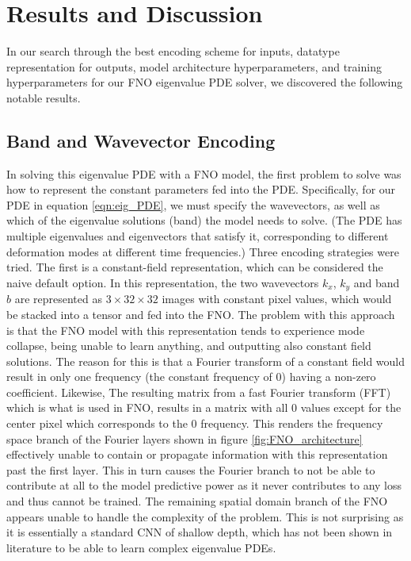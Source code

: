 \documentclass[preprint,review,12pt]{elsarticle}
\begin{document}
\section{Results and Discussion}
In our search through the best encoding scheme for inputs, datatype representation for outputs, model architecture hyperparameters, and training hyperparameters for our FNO eigenvalue PDE solver, we discovered the following notable results.  

\subsection{Band and Wavevector Encoding}
In solving this eigenvalue PDE with a FNO model, the first problem to solve was how to represent the constant parameters fed into the PDE. Specifically, for our PDE in equation \ref{eqn:eig_PDE}, we must specify the wavevectors, as well as which of the eigenvalue solutions (band) the model needs to solve. (The PDE has multiple eigenvalues and eigenvectors that satisfy it, corresponding to different deformation modes at different time frequencies.) Three encoding strategies were tried. The first is a constant-field representation, which can be considered the naive default option. In this representation, the two wavevectors $k_x$, $k_y$ and band $b$ are represented as $3 \times 32 \times 32$ images with constant pixel values, which would be stacked into a tensor and fed into the FNO. The problem with this approach is that the FNO model with this representation tends to experience mode collapse, being unable to learn anything, and outputting also constant field solutions. The reason for this is that a Fourier transform of a constant field would result in only one frequency (the constant frequency of 0) having a non-zero coefficient. Likewise, The resulting matrix from a fast Fourier transform (FFT) which is what is used in FNO, results in a matrix with all 0 values except for the center pixel which corresponds to the 0 frequency. This renders the frequency space branch of the Fourier layers shown in figure \ref{fig:FNO_architecture} effectively unable to contain or propagate information with this representation past the first layer. This in turn causes the Fourier branch to not be able to contribute at all to the model predictive power as it never contributes to any loss and thus cannot be trained. The remaining spatial domain branch of the FNO appears unable to handle the complexity of the problem. This is not surprising as it is essentially a standard CNN of shallow depth, which has not been shown in literature to be able to learn complex eigenvalue PDEs.
\end{document}
